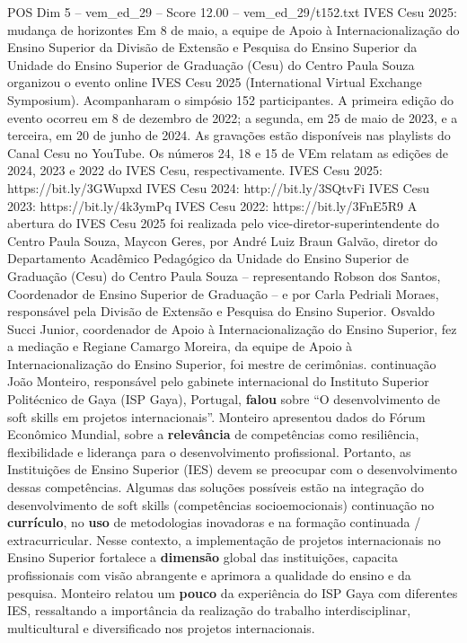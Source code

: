 \begin{textsample}{POS Dim 5 – vem\_ed\_29 – Score 12.00 – vem\_ed\_29/t152.txt}  \label{ex:f5_pos_043}
IVES Cesu 2025: mudança de horizontes Em 8 de maio, a equipe de Apoio à Internacionalização do Ensino Superior da Divisão de Extensão e Pesquisa do Ensino Superior da Unidade do Ensino Superior de Graduação (Cesu) do Centro Paula Souza organizou o evento online IVES Cesu 2025 (International Virtual Exchange Symposium).
Acompanharam o simpósio 152 participantes.
A primeira edição do evento ocorreu em 8 de dezembro de 2022; a segunda, em 25 de maio de 2023, e a terceira, em 20 de junho de 2024.
As gravações estão disponíveis nas playlists do Canal Cesu no YouTube.
Os números 24, 18 e 15 de VEm relatam as edições de 2024, 2023 e 2022 do IVES Cesu, respectivamente.
IVES Cesu 2025: https://bit.ly/3GWupxd IVES Cesu 2024: http://bit.ly/3SQtvFi IVES Cesu 2023: https://bit.ly/4k3ymPq IVES Cesu 2022: https://bit.ly/3FnE5R9 A abertura do IVES Cesu 2025 foi realizada pelo vice-diretor-superintendente do Centro Paula Souza, Maycon Geres, por André Luiz Braun Galvão, diretor do Departamento Acadêmico Pedagógico da Unidade do Ensino Superior de Graduação (Cesu) do Centro Paula Souza – representando Robson dos Santos, Coordenador de Ensino Superior de Graduação – e por Carla Pedriali Moraes, responsável pela Divisão de Extensão e Pesquisa do Ensino Superior.
Osvaldo Succi Junior, coordenador de Apoio à Internacionalização do Ensino Superior, fez a mediação e Regiane Camargo Moreira, da equipe de Apoio à Internacionalização do Ensino Superior, foi mestre de cerimônias. continuação João Monteiro, responsável pelo gabinete internacional do Instituto Superior Politécnico de Gaya (ISP Gaya), Portugal, \textbf{falou} sobre “O desenvolvimento de soft skills em projetos internacionais”.
Monteiro apresentou dados do Fórum Econômico Mundial, sobre a \textbf{relevância} de competências como resiliência, flexibilidade e liderança para o desenvolvimento profissional.
Portanto, as Instituições de Ensino Superior (IES) devem se preocupar com o desenvolvimento dessas competências.
Algumas das soluções possíveis estão na integração do desenvolvimento de soft skills (competências socioemocionais) continuação no \textbf{currículo}, no \textbf{uso} de metodologias inovadoras e na formação continuada / extracurricular.
Nesse contexto, a implementação de projetos internacionais no Ensino Superior fortalece a \textbf{dimensão} global das instituições, capacita profissionais com visão abrangente e aprimora a qualidade do ensino e da pesquisa.
Monteiro relatou um \textbf{pouco} da experiência do ISP Gaya com diferentes IES, ressaltando a importância da realização do trabalho interdisciplinar, multicultural e diversificado nos projetos internacionais.

\end{textsample}

